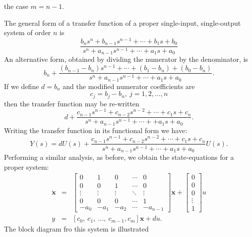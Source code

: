 the case $m=n-1$.
\begin{slide}\label{slide:l5s4}
\end{slide}

The general form of a transfer function of a proper single-input,
single-output system of order $n$ is
\[\frac{b_ns^n+b_{n-1}s^{n-1}+\cdots+b_1s + b_0}{s^n+a_{n-1}s^{n-1}+\cdots+a_1s + a_0}\]
An alternative form, obtained by dividing the numerator by the
denominator, is
\[b_n+\frac{(b_{n-1}-b_n)s^{n-1}+\cdots+(b_1-b_n)+(b_0-b_n)}{s^n+a_{n-1}s^{n-1}+\cdots+a_1s + a_0}.\]
If we define $d=b_n$ and the modified numerator coefficients are
\[c_j=b_j-b_n,\ j=1,2,\ldots,n\] then the transfer function may be
re-written
\[d+\frac{c_{n-1}s^{n-1}+c_{n-2}s^{n-2}+\cdots+c_1s + c_n}{s^n+a_{n-1}s^{n-1}+\cdots++a_1s + a_0}.\]
Writing the transfer function in its functional form we have:
\[Y(s)=d U(s) +\frac{c_{n-1}s^{n-1}+c_{n-2}s^{n-2}+\cdots+c_1s +
c_n}{s^n+a_{n-1}s^{n-1}+\cdots+a_1s + a_0}U(s).\] Performing a
similar analysis, as before, we obtain the state-equations for a
proper system:
\begin{eqnarray*}\dot{\mathbf{x}} & = & \left[\begin{array}{ccccc}
  0 & 1 & 0 & \cdots & 0 \\
  0 & 0 & 1 & \cdots & 0 \\
  \vdots & \vdots & \vdots & \ddots & \vdots \\
  0 & 0 & 0 & \cdots & 1 \\
  -a_{0} & -a_{1} & -a_{2} & \cdots & -a_{n-1}
\end{array}\right]\mathbf{x}+\left[\begin{array}{c}
  0 \\
  0 \\
  0 \\
  \vdots \\
  1
\end{array}\right]u\\
y & = & [c_0,\ c_1,\ \dots,\ c_{m-1}, c_m] \mathbf{x} + d
u.\end{eqnarray*} The block diagram fro this system is illustrated
